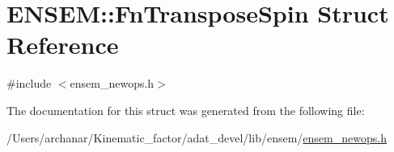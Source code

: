 \hypertarget{structENSEM_1_1FnTransposeSpin}{}\section{E\+N\+S\+EM\+:\+:Fn\+Transpose\+Spin Struct Reference}
\label{structENSEM_1_1FnTransposeSpin}


{\ttfamily \#include $<$ensem\+\_\+newops.\+h$>$}



The documentation for this struct was generated from the following file\+:\begin{DoxyCompactItemize}
\item 
/\+Users/archanar/\+Kinematic\+\_\+factor/adat\+\_\+devel/lib/ensem/\mbox{\hyperlink{lib_2ensem_2ensem__newops_8h}{ensem\+\_\+newops.\+h}}\end{DoxyCompactItemize}
